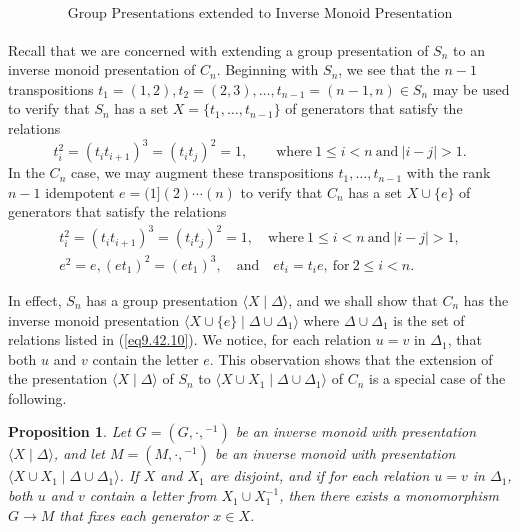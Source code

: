 \documentclass{surv-l}
\numberwithin{equation}{section}
\numberwithin{table}{section}
\numberwithin{figure}{section}
\theoremstyle{plain}
\newtheorem{proposition}[equation]{Proposition}
\theoremstyle{definition}
\begin{document}
\[
\text{Group Presentations extended to Inverse Monoid Presentation}
\]
\\
\indent Recall that we are concerned with extending a group presentation
of $S_{n}$ to an inverse monoid presentation of $C_{n}$. Beginning
with $S_{n}$, we see that the $n-1$ transpositions $t_{1}=(1,2),
t_{2}=(2,3),\ldots,t_{n-1}=(n-1,n) \in S_{n}$ may be used to
verify that $S_{n}$ has a set $X =\{t_{1},\ldots, t_{n-1}\}$ of
generators that satisfy the relations
\[
t_{i}^{2}=(t_{i}t_{i+1})^{3}=(t_{i}t_{j})^{2}=1,\qquad \mathrm{where}\ 1\leq
i<n\ \mathrm{and}\ |i-j|>1.
\]
In the $C_{n}$ case, we may augment these transpositions
$t_{1},\ldots,t_{n-1}$ with the rank $n-1$ idempotent
$e=(1](2)\cdots (n)$ to verify that $C_{n}$ has a set $X \cup\{e\}$
of generators that satisfy the relations
\begin{equation}\label{eq9.42.10}
\begin{split}
t_{i}^{2}=(t_{i}t_{i+1})^{3}=(t_{i}t_{j})^{2}=1,\quad \mathrm{where}\ 1\leq i<n\ \mathrm{and}\ |i-j|>1, \\
e^{2}=e, (et_{1})^{2}=(et_{1})^{3},\quad \mathrm{and}\quad et_{i}=t_{i}e,\ \mathrm{for}\ 2\leq i<n.\qquad
\end{split}
\end{equation}

In effect, $S_{n}$ has a group presentation $\langle X\mid
\Delta\rangle$, and we shall show that $C_{n}$ has the inverse
monoid presentation $\langle X\cup\{e\}\mid
\Delta\cup\Delta_{1}\rangle$ where
$\Delta\cup\Delta_{1}$ is the set of relations listed in
(\ref{eq9.42.10}). We notice, for each relation $u=v$ in
$\Delta_{1}$, that both $u$ and $v$ contain the letter $e$.
This observation shows that the extension of the presentation
$\langle X \mid \Delta\rangle$ of $S_{n}$ to $\langle X\cup
X_{1}\mid \Delta\cup\Delta_{1}\rangle$ of $C_{n}$ is a
special case of the following.

\begin{proposition}\label{prop9.42.11}
Let $G=(G,\cdot,{}^{-1})$ be an inverse monoid with presentation
$\langle X \mid \Delta\rangle$, and let
$M=(M,\cdot,{}^{-1})$ be an inverse monoid with presentation
$\langle X\cup X_{1}\mid \Delta\cup\Delta_{1}\rangle$.
If $X$ and $X_{1}$ are disjoint, and if for each relation $u=v$ in
$\Delta_{1}$, both $u$ and $v$ contain a letter from $X_{1}\cup
X_{1}^{-1}$, then there exists a monomorphism $G\rightarrow M$
that fixes each generator $x\in X$.
\end{proposition}
\end{document}
